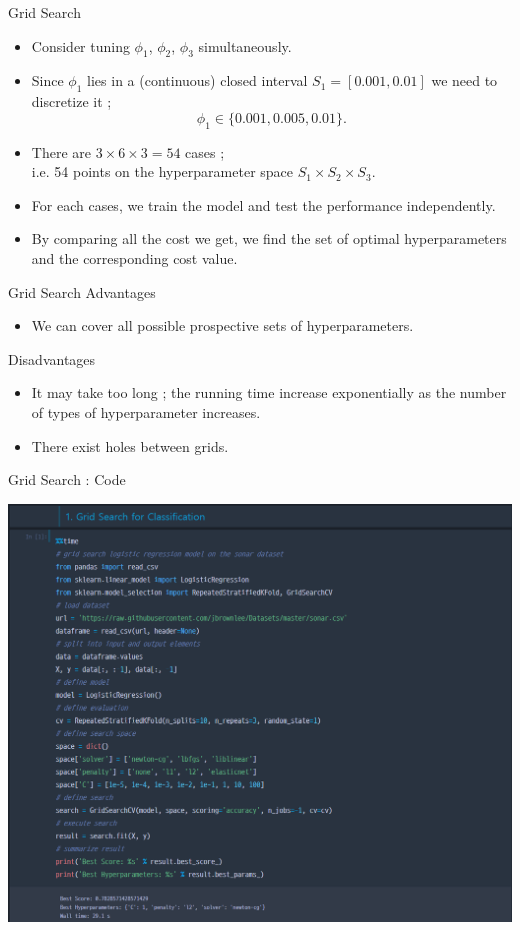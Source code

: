 \documentclass{beamer}
\begin{document}
%
\begin{frame}{Grid Search}
\begin{itemize}
\item
Consider tuning \(\phi_1\), \(\phi_2\), \(\phi_3\) simultaneously.
\item
Since \(\phi_1\) lies in a (continuous) closed interval \(S_1=[0.001,0.01]\) we need to discretize it ;
\[\phi_1\in\{0.001, 0.005, 0.01\}.\]
\item
There are \(3\times 6\times 3=54\) cases ;\\
i.e. 54 points on the hyperparameter space \(S_1\times S_2\times S_3\).%
\item
For each cases, we train the model and test the performance independently.
\item
By comparing all the cost we get, we find the set of optimal hyperparameters and the corresponding cost value.
\end{itemize}
\end{frame}

%
\begin{frame}{Grid Search}
Advantages
\begin{itemize}
\item
We can cover all possible prospective sets of hyperparameters.
\end{itemize}
Disadvantages
\begin{itemize}
\item
It may take too long ; the running time increase exponentially as the number of types of hyperparameter increases.
\item
There exist holes between grids.
\end{itemize}
\end{frame}

%
\begin{frame}{Grid Search : Code}
\begin{center}
\includegraphics[width=.75\textwidth]{2_2_grid_search}
\end{center}
\end{frame}
\end{document}
